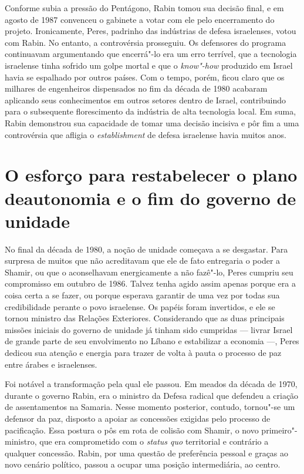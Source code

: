 Conforme subia a pressão do Pentágono, Rabin tomou sua decisão final, e
em agosto de 1987 convenceu o gabinete a votar com ele pelo encerramento do
projeto. Ironicamente, Peres, padrinho das indústrias de defesa
israelenses, votou com Rabin. No entanto, a controvérsia prosseguiu. Os
defensores do programa continuavam argumentando que encerrá"-lo era um
erro terrível, que a tecnologia israelense tinha sofrido um golpe mortal
e que o \textit{know"-how} produzido em Israel havia se espalhado por outros
países. Com o tempo, porém, ficou claro que os milhares de engenheiros
dispensados no fim da década de 1980 acabaram aplicando seus
conhecimentos em outros setores dentro de Israel, contribuindo para o
subsequente florescimento da indústria de alta tecnologia local. Em
suma, Rabin demonstrou sua capacidade de tomar uma decisão incisiva e
pôr fim a uma controvérsia que afligia o \textit{establishment} de defesa
israelense havia muitos anos.

\section[O esforço para restabelecer o plano de autonomia]{O esforço para restabelecer o plano de\break autonomia e o fim do governo de unidade}

No final da década de 1980, a noção de unidade começava a se
desgastar. Para surpresa de muitos que não acreditavam que ele de fato
entregaria o poder a Shamir, ou que o aconselhavam energicamente a não
fazê"-lo, Peres cumpriu seu compromisso em outubro de 1986. Talvez tenha
agido assim apenas porque era a coisa certa a se fazer, ou porque
esperava garantir de uma vez por todas sua credibilidade perante o
povo israelense. Os papéis foram invertidos, e ele se tornou ministro
das Relações Exteriores. Considerando que as duas principais missões
iniciais do governo de unidade já tinham sido cumpridas --- livrar Israel
de grande parte de seu envolvimento no Líbano e estabilizar a economia
---, Peres dedicou sua atenção e energia para trazer de volta à pauta o
processo de paz entre árabes e israelenses.

Foi notável a transformação pela qual ele passou. Em meados da década de
1970, durante o governo Rabin, era o ministro da Defesa radical que
defendeu a criação de assentamentos na Samaria. Nesse momento
posterior, contudo, tornou"-se um defensor da paz, disposto a apoiar as concessões
exigidas pelo processo de pacificação. Essa postura o pôs em rota de
colisão com Shamir, o novo primeiro"-ministro, que era comprometido com o
\textit{status quo} territorial e contrário a qualquer concessão. Rabin, por uma
questão de preferência pessoal e graças ao novo cenário político, passou
a ocupar uma posição intermediária, ao centro.

